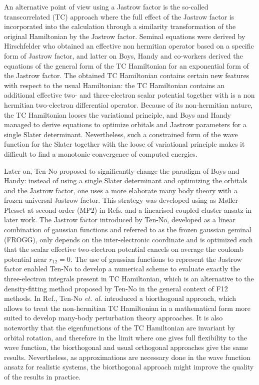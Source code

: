 \documentclass[aip,jcp,reprint,noshowkeys,superscriptaddress]{revtex4-1}
\begin{document}
An alternative point of view using a Jastrow factor is the so-called transcorrelated (TC) approach where the full effect of the Jastrow factor is incorporated into the calculation through a similarity transformation of the original Hamiltonian by the Jastrow factor. 
Seminal equations were derived by Hirschfelder\cite{Hirschfelder-JCP-63} who obtained an effective non hermitian operator based on a specific form of Jastrow factor, and latter on Boys, Handy and co-workers\cite{BoyHan-PRSLA-69,BoyHanLin-1-PRSLA-69,BoyHanLin-2-PRSLA-69} derived the equations of the general form of the TC Hamiltonian for an exponential form of the Jastrow factor. 
The obtained TC Hamiltonian contains certain new features with respect to the usual Hamiltonian: the TC Hamiltonian contains an additional effective two- and three-electron scalar potential together with is a non hermitian two-electron differential operator. Because of its non-hermitian nature, the TC Hamiltonian looses the variational principle, and Boys and Handy managed to derive equations to optimize orbitals and Jastrow parameters for a single Slater determinant. 
Nevertheless, such a constrained form of the wave function for the Slater together with the loose of variational principle makes it difficult to find a monotonic convergence of computed energies\cite{Handy-MolPhys-71}. 

Later on, Ten-No\cite{TenNo-CPL-00-a} proposed to significantly change the paradigm of Boys and Handy: instead of using a single Slater determinant and optimizing the orbitals and the Jastrow factor, one uses a more elaborate many body theory with a frozen universal Jastrow factor.  This strategy was developed using as M{\o}ller-Plesset at second order (MP2) in Refs. and a linearised coupled cluster ansatz in later work\cite{HinTanTen-CPL-02}.  
The Jastrow factor introduced by Ten-No, developed as a linear combination of gaussian functions and referred to as the frozen gaussian geminal (FROGG), only depends on the inter-electronic coordinate and is optimized such that the scalar effective two-electron  potential cancels on average the coulomb potential near $r_{12}=0$. The use of gaussian functions to represent the Jastrow factor enabled Ten-No to develop a numerical scheme to evaluate exactly the three-electron integrals present in TC Hamiltonian\cite{TenNo-CPL-00-b}, which is an alternative to the density-fitting method proposed by Ten-No in the general context of F12 methods\cite{TenMan-JCP-03}. 
In Ref., Ten-No \textit{et. al.} introduced a biorthogonal approach, 
which allows to treat the non-hermitian TC Hamiltonian in a mathematical form more suited 
to develop many-body perturbation theory approaches. 
It is also noteworthy that the eigenfunctions of the TC Hamiltonian are invariant by orbital rotation, 
and therefore in the limit where one gives full flexibility to the wave function, 
the biorthogonal and usual orthogonal approaches give the same results. 
Nevertheless, as approximations are necessary done in the wave function ansatz for realistic systems, 
the biorthogonal approach might improve the quality of the results in practice. 
\end{document}
